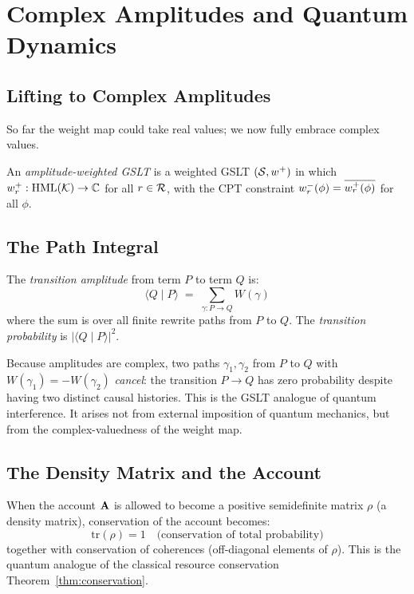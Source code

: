 \chapter{Complex Amplitudes and Quantum Dynamics}
\label{sec:quantum}

\section{Lifting to Complex Amplitudes}

So far the weight map could take real values; we now fully embrace complex
values.

\begin{definition}
An \emph{amplitude-weighted GSLT} is a weighted GSLT $(\mathcal{S}, w^{+})$ in
which $w^{+}_r : \mathrm{HML}(\mathcal{K}) \to \mathbb{C}$ for all $r \in \mathcal{R}$, with the
CPT constraint $w^{-}_r(\phi) = \overline{w^{+}_r(\phi)}$ for all $\phi$.
\end{definition}

\section{The Path Integral}

\begin{definition}
The \emph{transition amplitude} from term $P$ to term $Q$ is:
\[
  \langle Q \mid P \rangle \;=\; \sum_{\gamma : P \to Q} W(\gamma)
\]
where the sum is over all finite rewrite paths from $P$ to $Q$.
The \emph{transition probability} is $|\langle Q \mid P \rangle|^2$.
\end{definition}

\begin{remark}[Interference]
Because amplitudes are complex, two paths $\gamma_1, \gamma_2$ from $P$ to $Q$
with $W(\gamma_1) = -W(\gamma_2)$ \emph{cancel}: the transition
$P \to Q$ has zero probability despite having two distinct causal histories.
This is the GSLT analogue of quantum interference.  It arises not from external
imposition of quantum mechanics, but from the complex-valuedness of the weight
map.
\end{remark}

\section{The Density Matrix and the Account}

When the account $\mathbf{A}$ is allowed to become a positive semidefinite
matrix $\rho$ (a density matrix), conservation of the account becomes:
\[
  \mathrm{tr}(\rho) = 1 \quad \text{(conservation of total probability)}
\]
together with conservation of coherences (off-diagonal elements of $\rho$).
This is the quantum analogue of the classical resource conservation
Theorem~\ref{thm:conservation}.

